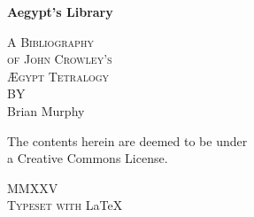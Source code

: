 

\pagestyle{empty}
\addtocounter{page}{-1}
\begin{center}
\bfseries
\nbvspace[0.5]
\Huge
\egothfamily
{\nbtitlestretch\fontsize{42pt}{48pt}\selectfont
Aegypt's Library}


\nbvspace[1]
\normalsize
\rmfamily
\textsc{A Bibliography\\
of John Crowley's\\
Ægypt Tetralogy}\\
\nbvspace[1]
\small BY\\[0.5em]
\Large Brian Murphy\\[0.5em]
\nbvspace[2]


\normalsize The contents herein are deemed to be under  \\
a Creative Commons License.

\nbvspace[1]

\shadowoffset{1pt}
\shadowtext{%
{\color{Mahogany}\fontsize{50}{54}\staveLXI}}
\nbvspace[1]
\normalsize


\textcopyleft \egothfamily MMXXV\\
\large
\rmfamily
\textsc{Typeset with} \LaTeX{}
\nbvspace[1]
\end{center}




